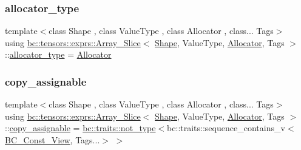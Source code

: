\subsubsection{\texorpdfstring{allocator\+\_\+type}{allocator\_type}}
{\footnotesize\ttfamily template$<$class Shape , class Value\+Type , class Allocator , class... Tags$>$ \\
using \hyperlink{classbc_1_1tensors_1_1exprs_1_1Array__Slice}{bc\+::tensors\+::exprs\+::\+Array\+\_\+\+Slice}$<$ \hyperlink{structbc_1_1Shape}{Shape}, Value\+Type, \hyperlink{classbc_1_1allocators_1_1Allocator}{Allocator}, Tags $>$\+::\hyperlink{classbc_1_1tensors_1_1exprs_1_1Array__Slice_a54761123998b091676d1b0deef26d376}{allocator\+\_\+type} =  \hyperlink{classbc_1_1allocators_1_1Allocator}{Allocator}}

\mbox{\label{classbc_1_1tensors_1_1exprs_1_1Array__Slice_a508429be1379f64010846460aef9a4bc}} 
\subsubsection{\texorpdfstring{copy\+\_\+assignable}{copy\_assignable}}
{\footnotesize\ttfamily template$<$class Shape , class Value\+Type , class Allocator , class... Tags$>$ \\
using \hyperlink{classbc_1_1tensors_1_1exprs_1_1Array__Slice}{bc\+::tensors\+::exprs\+::\+Array\+\_\+\+Slice}$<$ \hyperlink{structbc_1_1Shape}{Shape}, Value\+Type, \hyperlink{classbc_1_1allocators_1_1Allocator}{Allocator}, Tags $>$\+::\hyperlink{classbc_1_1tensors_1_1exprs_1_1Array__Slice_a508429be1379f64010846460aef9a4bc}{copy\+\_\+assignable} =  \hyperlink{namespacebc_1_1traits_a27454511d91930df60d099d9afdf46ff}{bc\+::traits\+::not\+\_\+type}$<$bc\+::traits\+::sequence\+\_\+contains\+\_\+v$<$\hyperlink{classbc_1_1tensors_1_1exprs_1_1BC__Const__View}{B\+C\+\_\+\+Const\+\_\+\+View}, Tags...$>$ $>$}

\mbox{\label{classbc_1_1tensors_1_1exprs_1_1Array__Slice_a3cf7241b4d83d7821c9e11ee5c22e570}} 
